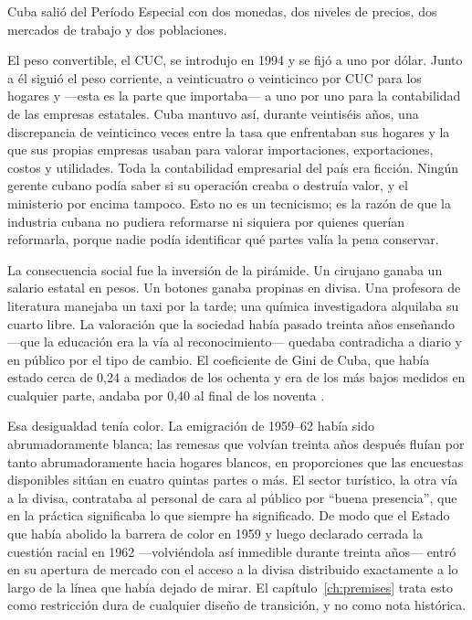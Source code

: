 Cuba salió del Período Especial con dos monedas, dos niveles de precios, dos
mercados de trabajo y dos poblaciones.

El peso convertible, el CUC, se introdujo en 1994 y se fijó a uno por dólar. Junto
a él siguió el peso corriente, a veinticuatro o veinticinco por CUC para los
hogares y ---esta es la parte que importaba--- a uno por uno para la contabilidad
de las empresas estatales. Cuba mantuvo así, durante veintiséis años, una
discrepancia de veinticinco veces entre la tasa que enfrentaban sus hogares y la
que sus propias empresas usaban para valorar importaciones, exportaciones, costos
y utilidades. Toda la contabilidad empresarial del país era ficción. Ningún
gerente cubano podía saber si su operación creaba o destruía valor, y el
ministerio por encima tampoco. Esto no es un tecnicismo; es la razón de que la
industria cubana no pudiera reformarse ni siquiera por quienes querían
reformarla, porque nadie podía identificar qué partes valía la pena conservar.

La consecuencia social fue la inversión de la pirámide. Un cirujano ganaba un
salario estatal en pesos. Un botones ganaba propinas en divisa. Una profesora de
literatura manejaba un taxi por la tarde; una química investigadora alquilaba su
cuarto libre. La valoración que la sociedad había pasado treinta años enseñando
---que la educación era la vía al reconocimiento--- quedaba contradicha a diario
y en público por el tipo de cambio. El coeficiente de Gini de Cuba, que había
estado cerca de 0,24 a mediados de los ochenta y era de los más bajos medidos en
cualquier parte, andaba por 0,40 al final de los noventa
\citep{mesalago2005}.\unv{}

Esa desigualdad tenía color. La emigración de 1959--62 había sido abrumadoramente
blanca; las remesas que volvían treinta años después fluían por tanto
abrumadoramente hacia hogares blancos, en proporciones que las encuestas
disponibles sitúan en cuatro quintas partes o más.\unv{} El sector turístico, la
otra vía a la divisa, contrataba al personal de cara al público por ``buena
presencia'', que en la práctica significaba lo que siempre ha significado. De modo
que el Estado que había abolido la barrera de color en 1959 y luego declarado
cerrada la cuestión racial en 1962 ---volviéndola así inmedible durante treinta
años--- entró en su apertura de mercado con el acceso a la divisa distribuido
exactamente a lo largo de la línea que había dejado de mirar. El
capítulo~\ref{ch:premises} trata esto como restricción dura de cualquier diseño de
transición, y no como nota histórica.

